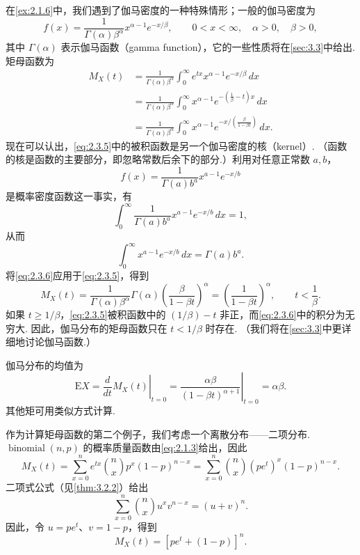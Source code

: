 \begin{example}[伽马分布的矩母函数]\label{ex:2.3.8}
在\autoref{ex:2.1.6}中，我们遇到了伽马密度的一种特殊情形；一般的伽马密度为
$$f(x)=\frac1{\Gamma(\alpha)\beta^\alpha}x^{\alpha-1}e^{-x/\beta},\qquad0<x<\infty,\quad\alpha>0,\quad\beta>0,$$
其中 $\Gamma(\alpha)$ 表示伽马函数（gamma function），它的一些性质将在\autoref{sec:3.3}中给出. 矩母函数为
\begin{equation}\label{eq:2.3.5}
\begin{aligned}
M_X(t)&=\frac1{\Gamma(\alpha)\beta^\alpha}\int_0^\infty e^{tx}x^{\alpha-1}e^{-x/\beta}\,dx\\
&=\frac1{\Gamma(\alpha)\beta^\alpha}\int_0^\infty x^{\alpha-1}e^{-(\frac1\beta-t)x}\,dx\\
&=\frac1{\Gamma(\alpha)\beta^\alpha}\int_0^\infty x^{\alpha-1}e^{-x/(\frac\beta{1-\beta t})}\,dx.
\end{aligned}
\end{equation}
现在可以认出，\eqref{eq:2.3.5}中的被积函数是另一个伽马密度的核（kernel）. （函数的核是函数的主要部分，即忽略常数后余下的部分.）利用对任意正常数 $a,b$，
$$f(x)=\frac1{\Gamma(a)b^a}x^{a-1}e^{-x/b}$$
是概率密度函数这一事实，有
$$\int_0^\infty\frac1{\Gamma(a)b^a}x^{a-1}e^{-x/b}\,dx=1,$$
从而
\begin{equation}\label{eq:2.3.6}
\int_0^\infty x^{a-1}e^{-x/b}\,dx=\Gamma(a)b^a.
\end{equation}
将\eqref{eq:2.3.6}应用于\eqref{eq:2.3.5}，得到
$$M_X(t)=\frac1{\Gamma(\alpha)\beta^\alpha}\Gamma(\alpha)
\left(\frac\beta{1-\beta t}\right)^\alpha
=\left(\frac1{1-\beta t}\right)^\alpha,\qquad t<\frac1\beta.$$
如果 $t\ge1/\beta$，\eqref{eq:2.3.5}被积函数中的 $(1/\beta)-t$ 非正，而\eqref{eq:2.3.6}中的积分为无穷大. 因此，伽马分布的矩母函数只在 $t<1/\beta$ 时存在. （我们将在\autoref{sec:3.3}中更详细地讨论伽马函数.）

伽马分布的均值为
$$\mathrm EX=\left.\frac d{dt}M_X(t)\right|_{t=0}
=\left.\frac{\alpha\beta}{(1-\beta t)^{\alpha+1}}\right|_{t=0}=\alpha\beta.$$
其他矩可用类似方式计算.
\end{example}

\begin{example}[二项分布的矩母函数]\label{ex:2.3.9}
作为计算矩母函数的第二个例子，我们考虑一个离散分布——二项分布. $\operatorname{binomial}(n,p)$ 的概率质量函数由\eqref{eq:2.1.3}给出，因此
$$M_X(t)=\sum_{x=0}^n e^{tx}\binom nx p^x(1-p)^{n-x}
=\sum_{x=0}^n\binom nx(pe^t)^x(1-p)^{n-x}.$$
二项式公式（见\autoref{thm:3.2.2}）给出
\begin{equation}\label{eq:2.3.7}
\sum_{x=0}^n\binom nx u^xv^{n-x}=(u+v)^n.
\end{equation}
因此，令 $u=pe^t$、$v=1-p$，得到
$$M_X(t)=[pe^t+(1-p)]^n.$$
\end{example}

